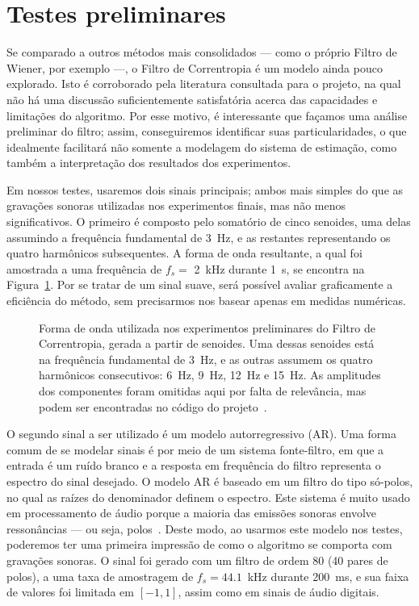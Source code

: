 \section{Testes preliminares}

Se comparado a outros métodos mais consolidados --- como o próprio Filtro de Wiener, por exemplo ---, o Filtro de Correntropia é um modelo ainda pouco explorado. Isto é corroborado pela literatura consultada para o projeto, na qual não há uma discussão suficientemente satisfatória acerca das capacidades e limitações do algoritmo. Por esse motivo, é interessante que façamos uma análise preliminar do filtro; assim, conseguiremos identificar suas particularidades, o que idealmente facilitará não somente a modelagem do sistema de estimação, como também a interpretação dos resultados dos experimentos.

Em nossos testes, usaremos dois sinais principais; ambos mais simples do que as gravações sonoras utilizadas nos experimentos finais, mas não menos significativos. O primeiro é composto pelo somatório de cinco senoides, uma delas assumindo a frequência fundamental de 3~Hz, e as restantes representando os quatro harmônicos subsequentes. A forma de onda resultante, a qual foi amostrada a uma frequência de $f_s =$ 2~kHz durante 1~s, se encontra na Figura~\ref{fig:correntropy:sinewave}. Por se tratar de um sinal suave, será possível avaliar graficamente a eficiência do método, sem precisarmos nos basear apenas em medidas numéricas.

\begin{figure}[!ht]
    \centering
    
    \caption[Forma de onda gerada a partir de senoides utilizada nos experimentos preliminares do Filtro de Correntropia]{Forma de onda utilizada nos experimentos preliminares do Filtro de Correntropia, gerada a partir de senoides. Uma dessas senoides está na frequência fundamental de 3~Hz, e as outras assumem os quatro harmônicos consecutivos: 6~Hz, 9~Hz, 12~Hz e 15~Hz. As amplitudes dos componentes foram omitidas aqui por falta de relevância, mas podem ser encontradas no código do projeto~\cite{nonlinear-filters-repo}.}
    \label{fig:correntropy:sinewave}
\end{figure}

O segundo sinal a ser utilizado é um modelo autorregressivo (AR). Uma forma comum de se modelar sinais é por meio de um sistema fonte-filtro, em que a entrada é um ruído branco e a resposta em frequência do filtro representa o espectro do sinal desejado. O modelo AR é baseado em um filtro do tipo só-polos, no qual as raízes do denominador definem o espectro. Este sistema é muito usado em processamento de áudio porque a maioria das emissões sonoras envolve ressonâncias --- ou seja, polos~\cite{godsill-2002}. Deste modo, ao usarmos este modelo nos testes, poderemos ter uma primeira impressão de como o algoritmo se comporta com gravações sonoras. O sinal foi gerado com um filtro de ordem 80 (40 pares de polos), a uma taxa de amostragem de $f_s = 44.1$~kHz durante 200~ms, e sua faixa de valores foi limitada em $[-1, 1]$, assim como em sinais de áudio digitais.

